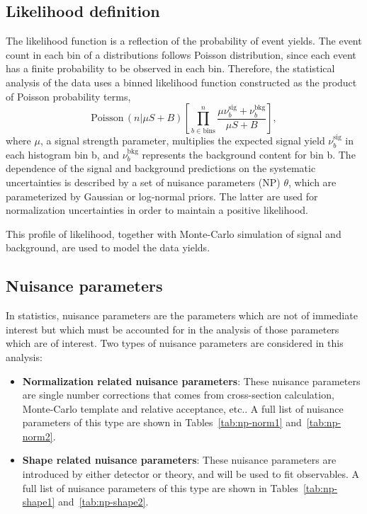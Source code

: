\subsection{Likelihood definition}

\par The likelihood function is a reflection of the probability of event yields. 
The event count in each bin of a distributions follows Poisson distribution, since each event has a finite probability to be observed in each bin.
Therefore, the statistical analysis of the data uses a binned likelihood function constructed as the product of Poisson probability terms,
\begin{equation}
\mathrm{Poisson}\,(n|\mu S+B)\left[ \prod_{b\in \text{bins}}^{n} \frac{\mu \nu^{\mathrm{sig}}_{b}+\nu^{\mathrm{bkg}}_{b}}{\mu S+B} \right],
\end{equation}
where $\mu$, a signal strength parameter, multiplies the expected signal yield $\nu^{\mathrm{sig}}_b$ in each histogram bin b, and $\nu^{\mathrm{bkg}}_b$ represents the background content for bin b. 
The dependence of the signal and background predictions on the systematic uncertainties is described by a set of nuisance parameters (NP) $\theta$, which are parameterized by Gaussian or log-normal priors. 
The latter are used for normalization uncertainties in order to maintain a positive likelihood.

\par This profile of likelihood, together with Monte-Carlo simulation of signal and background, are used to model the data yields.

\subsection{Nuisance parameters}

\par In statistics, nuisance parameters are the parameters which are not of immediate interest but which must be accounted for in the analysis of those parameters which are of interest. 
Two types of nuisance parameters are considered in this analysis:
\begin{itemize}
    \item \textbf{Normalization related nuisance parameters}: These nuisance parameters are single number corrections that comes from cross-section calculation, Monte-Carlo template and relative acceptance, etc.. 
    A full list of nuisance parameters of this type are shown in Tables~\ref{tab:np-norm1} and~\ref{tab:np-norm2}.
    \item \textbf{Shape related nuisance parameters}: These nuisance parameters are introduced by either detector or theory, and will be used to fit observables. 
    A full list of nuisance parameters of this type are shown in Tables~\ref{tab:np-shape1} and~\ref{tab:np-shape2}.
\end{itemize}

